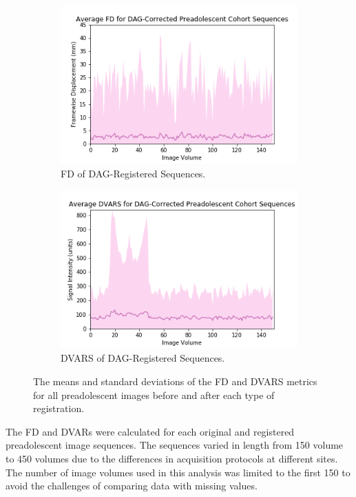 \begin{figure}
	\begin{subfigure}{0.4\textwidth}
		\centering
		\includegraphics[width=1.0\textwidth]{6/figures/preads-dag-fd-150.png}
		\caption{FD of DAG-Registered Sequences.}
	\end{subfigure}
	\hspace{0.05\textwidth}
	\begin{subfigure}{0.4\textwidth}
		\centering
		\includegraphics[width=1.0\textwidth]{6/figures/preads-dag-dvars-150.png}
		\caption{DVARS of DAG-Registered Sequences.}
	\end{subfigure}
\caption{The means and standard deviations of the FD and DVARS metrics for all preadolescent images before and after each type of registration.}
\label{fig:pread-power-dists}
\end{figure}

The FD and DVARs were calculated for each original and registered preadolescent image sequences. The sequences varied in length from 150 volume to 450 volumes due to the differences in acquisition protocols at different sites. The number of image volumes used in this analysis was limited to the first 150 to avoid the challenges of comparing data with missing values.

